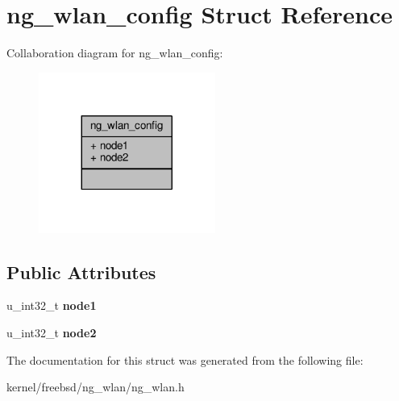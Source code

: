 \hypertarget{structng__wlan__config}{\section{ng\+\_\+wlan\+\_\+config Struct Reference}
\label{structng__wlan__config}
}


Collaboration diagram for ng\+\_\+wlan\+\_\+config\+:
\nopagebreak
\begin{figure}[H]
\begin{center}
\leavevmode
\includegraphics[width=164pt]{structng__wlan__config__coll__graph}
\end{center}
\end{figure}
\subsection*{Public Attributes}
\begin{DoxyCompactItemize}
\item 
\hypertarget{structng__wlan__config_a8c9a326c2479fcc46aea70ba1e0e8001}{u\+\_\+int32\+\_\+t {\bfseries node1}}\label{structng__wlan__config_a8c9a326c2479fcc46aea70ba1e0e8001}

\item 
\hypertarget{structng__wlan__config_a527653410939e28aebb4e93236c4a3f2}{u\+\_\+int32\+\_\+t {\bfseries node2}}\label{structng__wlan__config_a527653410939e28aebb4e93236c4a3f2}

\end{DoxyCompactItemize}


The documentation for this struct was generated from the following file\+:\begin{DoxyCompactItemize}
\item 
kernel/freebsd/ng\+\_\+wlan/ng\+\_\+wlan.\+h\end{DoxyCompactItemize}
